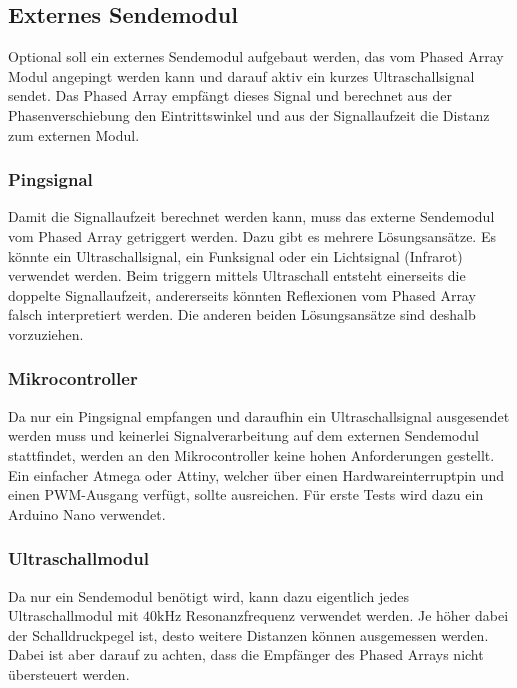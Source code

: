 \documentclass[10pt,a4paper,oneside]{99_fhnwreport}
\begin{document}
\subsection*{Externes Sendemodul}
Optional soll ein externes Sendemodul aufgebaut werden, das vom Phased Array Modul angepingt werden kann und darauf aktiv ein kurzes Ultraschallsignal sendet. Das Phased Array empfängt dieses Signal und berechnet aus der Phasenverschiebung den Eintrittswinkel und aus der Signallaufzeit die Distanz zum externen Modul.

\subsubsection*{Pingsignal}
Damit die Signallaufzeit berechnet werden kann, muss das externe Sendemodul vom Phased Array getriggert werden. Dazu gibt es mehrere Lösungsansätze. Es könnte ein Ultraschallsignal, ein Funksignal oder ein Lichtsignal (Infrarot) verwendet werden. Beim triggern mittels Ultraschall entsteht einerseits die doppelte Signallaufzeit, andererseits könnten Reflexionen vom Phased Array falsch interpretiert werden. Die anderen beiden Lösungsansätze sind deshalb vorzuziehen.

\subsubsection*{Mikrocontroller}
Da nur ein Pingsignal empfangen und daraufhin ein Ultraschallsignal ausgesendet werden muss und keinerlei Signalverarbeitung auf dem externen Sendemodul stattfindet, werden an den Mikrocontroller keine hohen Anforderungen gestellt. Ein einfacher Atmega oder Attiny, welcher über einen Hardwareinterruptpin und einen PWM-Ausgang verfügt, sollte ausreichen. Für erste Tests wird dazu ein Arduino Nano verwendet.

\subsubsection*{Ultraschallmodul}
Da nur ein Sendemodul benötigt wird, kann dazu eigentlich jedes Ultraschallmodul mit $40 \mathrm{kHz}$ Resonanzfrequenz verwendet werden. Je höher dabei der Schalldruckpegel ist, desto weitere Distanzen können ausgemessen werden. Dabei ist aber darauf zu achten, dass die Empfänger des Phased Arrays nicht übersteuert werden.

\clearpage


\end{document}
